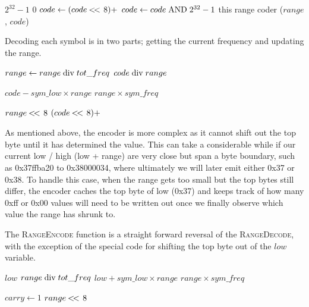 \documentclass[a4paper]{article}
\begin{document}
\begin{algorithmic}[1]
  \settowidth{\maxwidth}{range\ }
  \State {} $2^{32}-1$
  \State {} $0$
    \State $code \gets (code \mathbin{<\mkern-3mu<\,} 8) + $
  \EndFor
  \State $code \gets code \bitand 2^{32}-1$
  \State \Return this range coder ($range$, $code$)
\EndFunction
\end{algorithmic}

Decoding each symbol is in two parts; getting the current frequency and updating the range.

\begin{algorithmic}[1]
  \State $range \gets range \bdiv tot\_freq$
  \State \Return $code \bdiv range$
\EndFunction
\end{algorithmic}

\begin{algorithmic}[1]
  \settowidth{\maxwidth}{range\ }
  \State {} $code - sym\_low \times range$
  \State {} $range \times sym\_freq$

   
    \settowidth{\maxwidth}{range\ }
    \State {} $range \mathbin{<\mkern-3mu<\,} 8$
    \State {} $(code\mathbin{<\mkern-3mu<\,}8) + $
  \EndWhile
\EndProcedure
\end{algorithmic}

As mentioned above, the encoder is more complex as it cannot shift out the top byte until it has determined the value.
This can take a considerable while if our current low / high (low + range) are very close but span a byte boundary, such as 0x37ffba20 to 0x38000034, where ultimately we will later emit either 0x37 or 0x38.
To handle this case, when the range gets too small but the top bytes still differ, the encoder caches the top byte of low (0x37) and keeps track of how many 0xff or 0x00 values will need to be written out once we finally observe which value the range has shrunk to.

The \textsc{RangeEncode} function is a straight forward reversal of the \textsc{RangeDecode}, with the exception of the special code for shifting the top byte out of the $low$ variable.

\begin{algorithmic}[1]
  \settowidth{\maxwidth}{old\_low\ }
  \State {} $low$
  \State {} $range \bdiv tot\_freq$
  \State {} $low + sym\_low \times range$
  \State {} $range \times sym\_freq$

  \Statex
    \State $carry \gets 1$ 
  \EndIf
   
    \settowidth{\maxwidth}{range\ }
    \State {} $range \mathbin{<\mkern-3mu<\,} 8$
    \State {}
  \EndWhile
\EndProcedure
\end{algorithmic}
\end{document}
